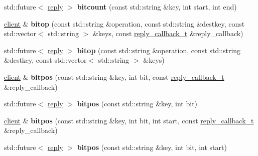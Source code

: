 \begin{DoxyCompactItemize}
std\+::future$<$ \hyperlink{classcpp__redis_1_1reply}{reply} $>$ {\bfseries bitcount} (const std\+::string \&key, int start, int end)
\item 
\mbox{\label{classcpp__redis_1_1client_a9289b0f474073f59509b565d93c69506}} 
\hyperlink{classcpp__redis_1_1client}{client} \& {\bfseries bitop} (const std\+::string \&operation, const std\+::string \&destkey, const std\+::vector$<$ std\+::string $>$ \&keys, const \hyperlink{classcpp__redis_1_1client_a061a1140d36d2eaeda82b09a0bb3f9f2}{reply\+\_\+callback\+\_\+t} \&reply\+\_\+callback)
\item 
\mbox{\label{classcpp__redis_1_1client_adbb955ee435dea43898ef811b31421b3}} 
std\+::future$<$ \hyperlink{classcpp__redis_1_1reply}{reply} $>$ {\bfseries bitop} (const std\+::string \&operation, const std\+::string \&destkey, const std\+::vector$<$ std\+::string $>$ \&keys)
\item 
\mbox{\label{classcpp__redis_1_1client_adf2ef5d020a8efbf6f6eb91cde63f262}} 
\hyperlink{classcpp__redis_1_1client}{client} \& {\bfseries bitpos} (const std\+::string \&key, int bit, const \hyperlink{classcpp__redis_1_1client_a061a1140d36d2eaeda82b09a0bb3f9f2}{reply\+\_\+callback\+\_\+t} \&reply\+\_\+callback)
\item 
\mbox{\label{classcpp__redis_1_1client_a5be47a4b3f9a36c4fab420468d50256a}} 
std\+::future$<$ \hyperlink{classcpp__redis_1_1reply}{reply} $>$ {\bfseries bitpos} (const std\+::string \&key, int bit)
\item 
\mbox{\label{classcpp__redis_1_1client_a8f6b7958a3094c975c3ca053b263c523}} 
\hyperlink{classcpp__redis_1_1client}{client} \& {\bfseries bitpos} (const std\+::string \&key, int bit, int start, const \hyperlink{classcpp__redis_1_1client_a061a1140d36d2eaeda82b09a0bb3f9f2}{reply\+\_\+callback\+\_\+t} \&reply\+\_\+callback)
\item 
\mbox{\label{classcpp__redis_1_1client_aa0ae004e45eb37ffed4d8c9f5ea35b4c}} 
std\+::future$<$ \hyperlink{classcpp__redis_1_1reply}{reply} $>$ {\bfseries bitpos} (const std\+::string \&key, int bit, int start)
\item 
\mbox{\label{classcpp__redis_1_1client_a3655449a666a9111d3dce7e61932ab1b}} 

\end{DoxyCompactItemize}
